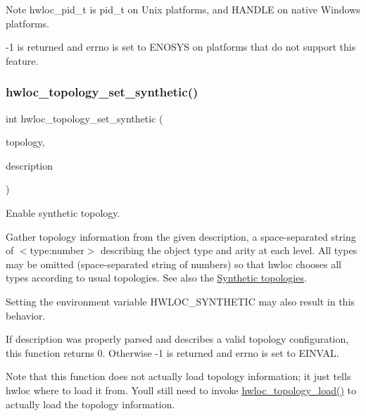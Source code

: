 \begin{DoxyNote}{Note}
{\ttfamily hwloc\+\_\+pid\+\_\+t} is {\ttfamily pid\+\_\+t} on Unix platforms, and {\ttfamily H\+A\+N\+D\+LE} on native Windows platforms.

-\/1 is returned and errno is set to E\+N\+O\+S\+YS on platforms that do not support this feature. 
\end{DoxyNote}
\mbox{\label{a00192_ga4fab186bb6181a00bcf585825fddd38d}} 
\subsubsection{\texorpdfstring{hwloc\+\_\+topology\+\_\+set\+\_\+synthetic()}{hwloc\_topology\_set\_synthetic()}}
{\footnotesize\ttfamily int hwloc\+\_\+topology\+\_\+set\+\_\+synthetic (\begin{DoxyParamCaption}\item[{\hyperlink{a00186_ga9d1e76ee15a7dee158b786c30b6a6e38}{hwloc\+\_\+topology\+\_\+t} restrict}]{topology,  }\item[{const char $\ast$restrict}]{description }\end{DoxyParamCaption})}



Enable synthetic topology. 

Gather topology information from the given {\ttfamily description}, a space-\/separated string of $<$type\+:number$>$ describing the object type and arity at each level. All types may be omitted (space-\/separated string of numbers) so that hwloc chooses all types according to usual topologies. See also the \hyperlink{a00389}{Synthetic topologies}.

Setting the environment variable H\+W\+L\+O\+C\+\_\+\+S\+Y\+N\+T\+H\+E\+T\+IC may also result in this behavior.

If {\ttfamily description} was properly parsed and describes a valid topology configuration, this function returns 0. Otherwise -\/1 is returned and errno is set to E\+I\+N\+V\+AL.

Note that this function does not actually load topology information; it just tells hwloc where to load it from. You\textquotesingle{}ll still need to invoke \hyperlink{a00186_gabdf58d87ad77f6615fccdfe0535ff826}{hwloc\+\_\+topology\+\_\+load()} to actually load the topology information.

